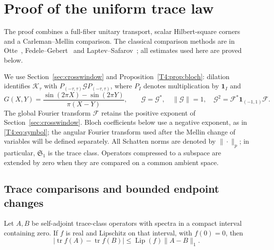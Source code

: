 \section{Proof of the uniform trace law}\label{app:general-trace}

The proof combines a full-fiber unitary transport, scalar Hilbert-square
corners and a Carleman--Mellin comparison. The classical comparison
methods are in Otte~\cite[Lemmas~3.1--3.3]{Otte2024},
Fedele--Gebert~\cite[proof of Corollary~1.5]{FedeleGebert2019} and
Laptev--Safarov~\cite[Theorem~1.2]{LaptevSafarov1996}; all estimates used
here are proved below.

We use Section~\ref{sec:crosswindow} and
Proposition~\ref{T4:prop:bloch}: dilation identifies
$\mathcal K_\tau$ with $P_{(-\tau,\tau)}\mathcal G P_{(-\tau,\tau)}$,
where $P_I$ denotes multiplication by $\mathbf1_I$ and
\begin{equation}\label{rev5:eq:G}
 G(X,Y)=\frac{\sin(2\pi X)-\sin(2\pi Y)}{\pi(X-Y)},\qquad
 \mathcal G=\mathcal G^*,\quad \|\mathcal G\|=1,\quad
 \mathcal G^2=\mathcal F^*\mathbf1_{(-1,1)}\mathcal F.
\end{equation}
The global Fourier transform $\mathcal F$ retains the positive exponent
of Section~\ref{sec:crosswindow}.  Bloch coefficients below use a negative
exponent, as in \eqref{T4:eq:symbol}; the angular Fourier transform used
after the Mellin change of variables will be defined separately.
All Schatten norms are denoted by $\|\cdot\|_p$; in particular,
$\mathfrak S_1$ is the trace class.  Operators compressed to a subspace
are extended by zero when they are compared on a common ambient space.

\subsection{Trace comparisons and bounded endpoint changes}
\label{rev5:subsec:trace-comparisons}

\begin{lemma}\label{rev5:lem:trace-lip}
Let $A,B$ be self-adjoint trace-class operators with spectra in a compact
interval containing zero.  If $f$ is real and Lipschitz on that interval,
with $f(0)=0$, then
\begin{equation}\label{rev5:eq:trace-lip}
 |\operatorname{tr}f(A)-\operatorname{tr}f(B)|
 \leq\operatorname{Lip}(f)\|A-B\|_1.
\end{equation}
\end{lemma}

